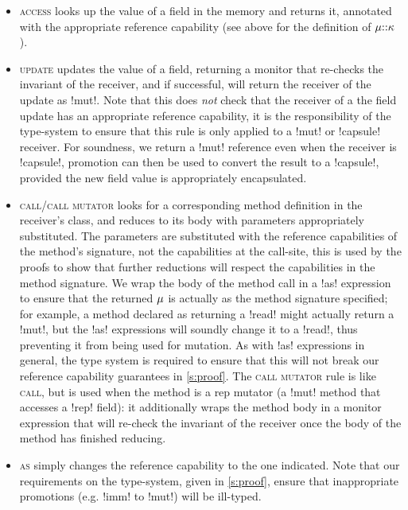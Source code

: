 \begin{itemize}
\item \textsc{access} looks up the value of a field in the memory and returns it, annotated with the appropriate reference capability (see above for the definition of $\mu{::}\kappa$).
\item \textsc{update} updates the value of a field, returning a monitor that re-checks the invariant of the receiver, and if successful, will return the receiver of the update as \Q!mut!. Note that this does \emph{not} check that the receiver of a the field update has an appropriate reference capability, it is the responsibility of the type-system to ensure that this rule is only applied to a \Q!mut! or \Q!capsule! receiver. For soundness, we return a \Q!mut! reference even when the receiver is \Q!capsule!, promotion can then be used to convert the result to a \Q!capsule!, provided the new field value is appropriately encapsulated.
\item \textsc{call/call mutator} looks for a corresponding method definition in the receiver's class, and reduces to its body with parameters appropriately substituted. The parameters are substituted with the reference capabilities of the method's signature, not the capabilities at the call-site, this is used by the proofs to show that further reductions will respect the capabilities in the method signature. We wrap the body of the method call in a \Q!as! expression to ensure that the returned $\mu$ is actually as the method signature specified; for example, a method declared as returning a \Q!read! might actually return a \Q!mut!, but the \Q!as! expressions will soundly change it to a \Q!read!, thus preventing it from being used for mutation. As with \Q!as! expressions in general, the type system is required to ensure that this will not break our reference capability guarantees in \ref{s:proof}.
The \textsc{call mutator} rule is like \textsc{call}, but is used when the method is a rep mutator (a \Q!mut! method that accesses a \Q!rep! field):
it additionally wraps the method body in a monitor expression that will re-check the invariant of the receiver once the body of the method has finished reducing.

\item \textsc{as} simply changes the reference capability to the one indicated. Note that our requirements on the type-system, given in \ref{s:proof}, ensure that inappropriate promotions (e.g. \Q!imm! to \Q!mut!) will be ill-typed.


\end{itemize}
